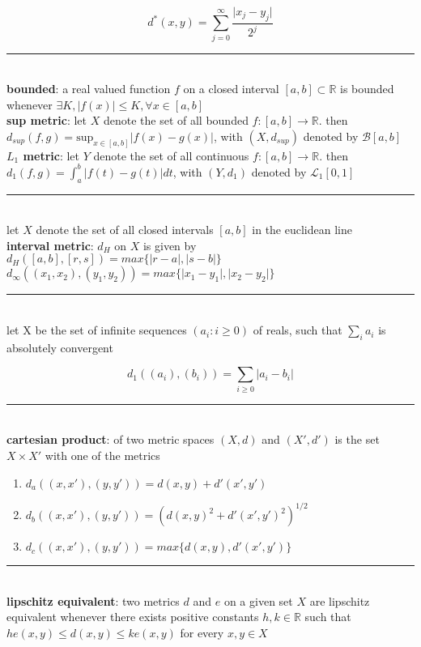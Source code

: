 \documentclass[a4paper]{article}
\newcommand*\abs[1]{\vert #1 \vert}
\newcommand*\linesep[0]{\noindent\rule{\textwidth}{0.5pt}\\}
\begin{document}
\begin{multicols}{2}
\begin{framed}
	$$d^*(x, y) = \sum_{j=0}^\infty \frac{\abs{x_j - y_j}}{2^j}$$
	
	\linesep
	\noindent
	\textbf{bounded}: a real valued function $f$ on a closed interval $[a, b] \subset \mathbb{R}$ is bounded whenever $\exists K, \abs{f(x)} \leq K, \forall x \in [a, b]$\\
	
	\noindent
	\textbf{sup metric}: let $X$ denote the set of all bounded $f: [a, b] \rightarrow \mathbb{R}$. then $d_{sup}(f,g) = \text{sup}_{x \in [a, b]} \abs{f(x) - g(x)}$, with $(X, d_{sup})$ denoted by $\mathcal{B}[a, b]$\\
	
	\noindent
	\textbf{$L_1$ metric}: let $Y$ denote the set of all continuous $f: [a, b] \rightarrow \mathbb{R}$. then $d_1(f, g) = \int_a^b \abs{f(t) - g(t)} dt$, with $(Y,d_1)$ denoted by $\mathcal{L}_1[0, 1]$
	
	\linesep
	\noindent
	let $X$ denote the set of all closed intervals $[a, b]$ in the euclidean line\\
	
	\noindent
	\textbf{interval metric}: $d_H$ on $X$ is given by $d_H([a, b], [r, s]) = max\{\abs{r-a}, \abs{s-b}\}$\\
	
	\noindent
	$d_\infty((x_1, x_2), (y_1, y_2)) = max\{\abs{x_1 - y_1}, \abs{x_2 - y_2}\}$
	
	\linesep
	let X be the set of infinite sequences $(a_i : i \geq 0)$ of reals, such that $\sum_i a_i$ is absolutely convergent
	
	$$d_1((a_i), (b_i)) = \sum_{i \geq 0} \abs{a_i - b_i}$$
	
	\linesep
	\textbf{cartesian product}: of two metric spaces $(X, d)$ and $(X', d')$ is the set $X \times X'$ with one of the metrics
	\begin{enumerate}
		\item $d_a((x, x'), (y, y')) = d(x, y) + d'(x', y')$
		\item $d_b((x, x'), (y, y')) = (d(x, y)^2 + d'(x', y')^2)^{1/2}$
		\item $d_c((x, x'), (y, y')) = max\{d(x, y), d'(x', y')\}$
	\end{enumerate}
	
	\linesep
	\noindent
	\textbf{lipschitz equivalent}: two metrics $d$ and $e$ on a given set $X$ are lipschitz equivalent whenever there exists positive constants $h, k \in \mathbb{R}$ such that $he(x, y) \leq d(x, y) \leq ke(x, y)$ for every $x, y \in X$\\
	

\end{framed}
\end{multicols}
\end{document}
